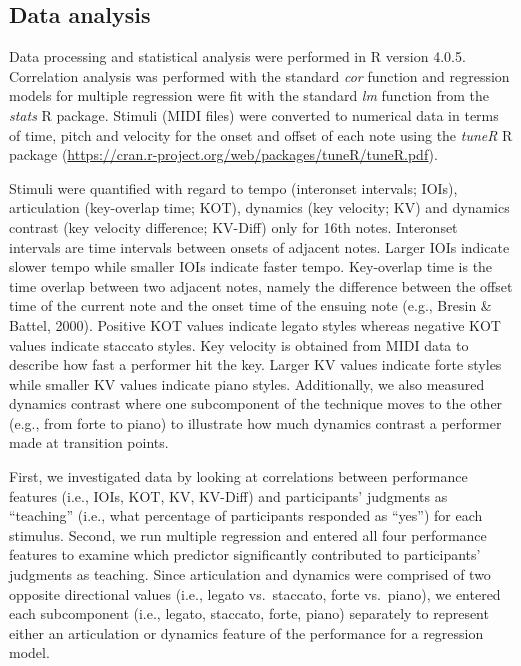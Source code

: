 \documentclass[
  man,floatsintext]{apa6}
\begin{document}
\hypertarget{dataanalysis}{%
\subsection{Data analysis}\label{dataanalysis}}

Data processing and statistical analysis were performed in R version 4.0.5. Correlation analysis was performed with the standard \emph{cor} function and regression models for multiple regression were fit with the standard \emph{lm} function from the \emph{stats} R package. Stimuli (MIDI files) were converted to numerical data in terms of time, pitch and velocity for the onset and offset of each note using the \emph{tuneR} R package (\url{https://cran.r-project.org/web/packages/tuneR/tuneR.pdf}).

Stimuli were quantified with regard to tempo (interonset intervals; IOIs), articulation (key-overlap time; KOT), dynamics (key velocity; KV) and dynamics contrast (key velocity difference; KV-Diff) only for 16th notes. Interonset intervals are time intervals between onsets of adjacent notes. Larger IOIs indicate slower tempo while smaller IOIs indicate faster tempo. Key-overlap time is the time overlap between two adjacent notes, namely the difference between the offset time of the current note and the onset time of the ensuing note (e.g., Bresin \& Battel, 2000). Positive KOT values indicate legato styles whereas negative KOT values indicate staccato styles. Key velocity is obtained from MIDI data to describe how fast a performer hit the key. Larger KV values indicate forte styles while smaller KV values indicate piano styles. Additionally, we also measured dynamics contrast where one subcomponent of the technique moves to the other (e.g., from forte to piano) to illustrate how much dynamics contrast a performer made at transition points.

First, we investigated data by looking at correlations between performance features (i.e., IOIs, KOT, KV, KV-Diff) and participants' judgments as ``teaching'' (i.e., what percentage of participants responded as ``yes'') for each stimulus. Second, we run multiple regression and entered all four performance features to examine which predictor significantly contributed to participants' judgments as teaching. Since articulation and dynamics were comprised of two opposite directional values (i.e., legato vs.~staccato, forte vs.~piano), we entered each subcomponent (i.e., legato, staccato, forte, piano) separately to represent either an articulation or dynamics feature of the performance for a regression model.
\end{document}
